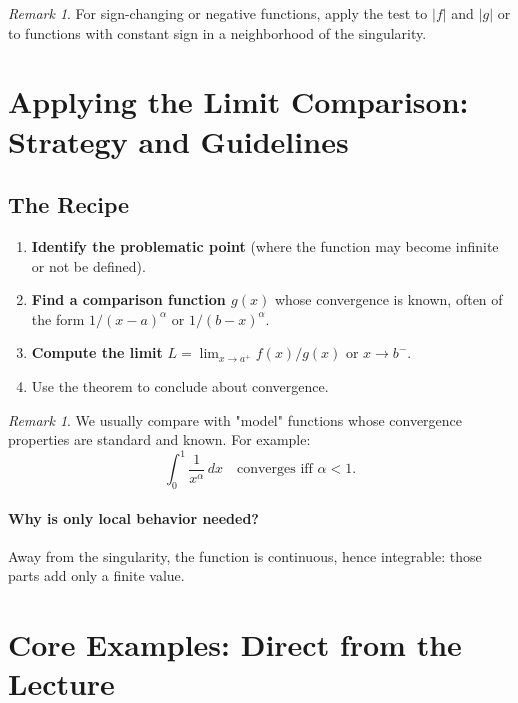 \documentclass[12pt]{article}
\theoremstyle{definition}
\theoremstyle{plain}
\theoremstyle{remark}
\newtheorem{remark}[definition]{Remark}
\begin{document}
\begin{remark}
For sign-changing or negative functions, apply the test to $|f|$ and $|g|$ or to functions with constant sign in a neighborhood of the singularity.
\end{remark}

\section{Applying the Limit Comparison: Strategy and Guidelines}

\subsection{The Recipe}
\begin{enumerate}[leftmargin=2em]
    \item \textbf{Identify the problematic point} (where the function may become infinite or not be defined).
    \item \textbf{Find a comparison function $g(x)$} whose convergence is known, often of the form $1/(x-a)^{\alpha}$ or $1/(b-x)^{\alpha}$.
    \item \textbf{Compute the limit} $L = \lim_{x \to a^+} f(x)/g(x)$ or $x \to b^-$.
    \item Use the theorem to conclude about convergence.
\end{enumerate}
\begin{remark}
We usually compare with "model" functions whose convergence properties are standard and known. For example:
\[
\int_0^1 \frac{1}{x^{\alpha}}\,dx \quad \text{converges iff } \alpha < 1.
\]
\end{remark}

\paragraph{Why is only local behavior needed?} Away from the singularity, the function is continuous, hence integrable: those parts add only a finite value.

\section{Core Examples: Direct from the Lecture}\label{sec:core-examples}
\end{document}

